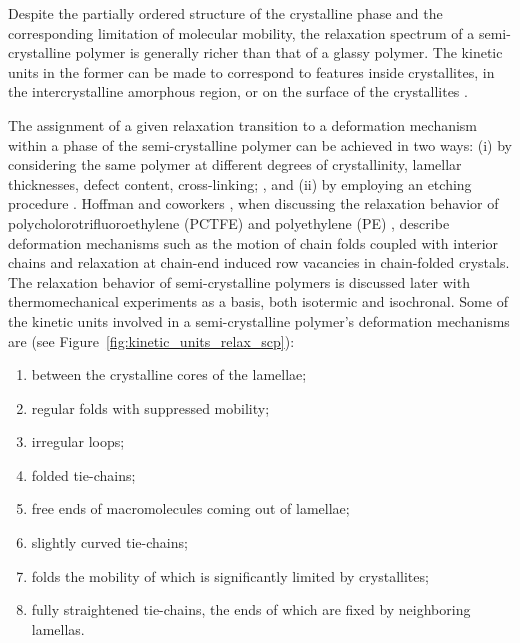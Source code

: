 Despite the partially ordered structure of the crystalline phase and the corresponding limitation of molecular mobility, the relaxation spectrum of a semi-crystalline polymer is generally richer than that of a glassy polymer.
The kinetic units in the former can be made to correspond to features inside crystallites, in the intercrystalline amorphous region, or on the surface of the crystallites \citep{ferryViscoelasticPropertiesPolymers1980, arzhakovRelaxationPhysicalMechanical2019}.

The assignment of a given relaxation transition to a deformation mechanism within a phase of the semi-crystalline polymer can be achieved in two ways: (i) by considering the same polymer at different degrees of crystallinity, lamellar thicknesses, defect content, cross-linking; \citep{ferryViscoelasticPropertiesPolymers1980}, and (ii) by employing an etching procedure \citep{arzhakovRelaxationPhysicalMechanical2019}.
Hoffman and coworkers \citep{hoffmanAnalysisRelaxationsPolychlorotrifluoroethylene2007}, when discussing the relaxation behavior of polycholorotrifluoroethylene (PCTFE)   and polyethylene (PE)  , describe deformation mechanisms such as the motion of chain folds coupled with interior chains and relaxation at chain-end induced row vacancies in chain-folded crystals.
The relaxation behavior of semi-crystalline polymers is discussed later with thermomechanical experiments as a basis, both isotermic and isochronal.
Some of the kinetic units involved in a semi-crystalline polymer's deformation mechanisms are \citep{arzhakovRelaxationPhysicalMechanical2019} (see Figure~\ref{fig:kinetic_units_relax_scp}):
\begin{enumerate}
    \item between the crystalline cores of the lamellae;
    \item regular folds with suppressed mobility;
    \item irregular loops;
    \item folded tie-chains;
    \item free ends of macromolecules coming out of lamellae;
    \item slightly curved tie-chains;
    \item folds the mobility of which is significantly limited by crystallites;
    \item fully straightened tie-chains, the ends of which are fixed by neighboring lamellas.
\end{enumerate}
